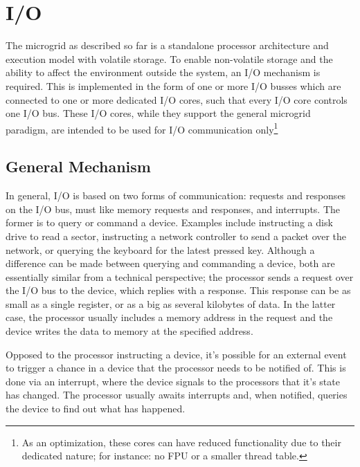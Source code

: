 \chapter{I/O}

The microgrid as described so far is a standalone processor architecture and execution model with volatile storage. To enable non-volatile storage and the ability to affect the environment outside the system, an I/O mechanism is required. This is implemented in the form of one or more I/O busses which are connected to one or more dedicated I/O cores, such that every I/O core controls one I/O bus. These I/O cores, while they support the general microgrid paradigm, are intended to be used for I/O communication only\footnote{As an optimization, these cores can have reduced functionality due to their dedicated nature; for instance: no FPU or a smaller thread table.}

\section{General Mechanism}
In general, I/O is based on two forms of communication: requests and responses on the I/O bus, must like memory requests and responses, and interrupts. The former is to query or command a device. Examples include instructing a disk drive to read a sector, instructing a network controller to send a packet over the network, or querying the keyboard for the latest pressed key. Although a difference can be made between querying and commanding a device, both are essentially similar from a technical perspective; the processor sends a request over the I/O bus to the device, which replies with a response. This response can be as small as a single register, or as a big as several kilobytes of data. In the latter case, the processor usually includes a memory address in the request and the device writes the data to memory at the specified address.

Opposed to the processor instructing a device, it's possible for an external event to trigger a chance in a device that the processor needs to be notified of. This is done via an interrupt, where the device signals to the processors that it's state has changed. The processor usually awaits interrupts and, when notified, queries the device to find out what has happened.

